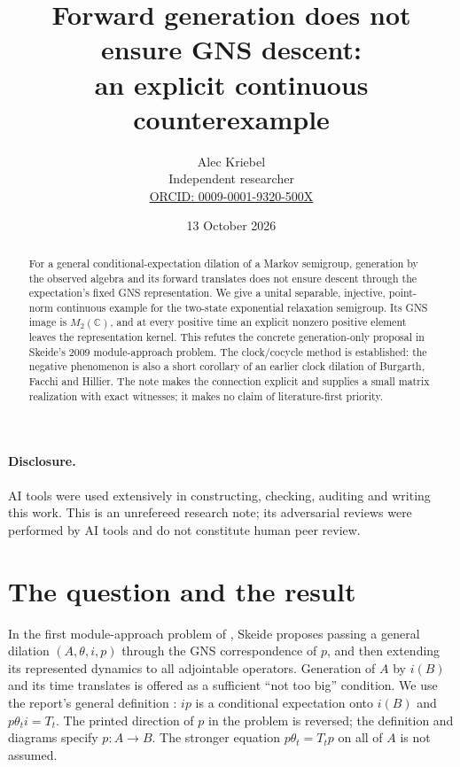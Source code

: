 \documentclass[11pt]{article}
\title{Forward generation does not ensure GNS descent:\\an explicit continuous counterexample}
\author{Alec Kriebel\\Independent researcher\\
\small\href{https://orcid.org/0009-0001-9320-500X}{ORCID: 0009-0001-9320-500X}}
\date{13 October 2026}
\newcommand{\C}{\mathbb C}
\begin{document}
\maketitle
\begin{abstract}
For a general conditional-expectation dilation of a Markov semigroup,
generation by the observed algebra and its forward translates does not
ensure descent through the expectation's fixed GNS representation. We give
a unital separable, injective, point-norm continuous example for the
two-state exponential relaxation semigroup. Its GNS image is $M_2(\C)$,
and at every positive time an explicit nonzero positive element leaves
the representation kernel. This refutes the concrete generation-only
proposal in Skeide's 2009 module-approach problem. The clock/cocycle
method is established: the negative phenomenon is also a short corollary
of an earlier clock dilation of Burgarth, Facchi and Hillier. The note
makes the connection explicit and supplies a small matrix realization
with exact witnesses; it makes no claim of literature-first priority.
\end{abstract}

\paragraph{Disclosure.}
AI tools were used extensively in constructing, checking, auditing and
writing this work. This is an unrefereed research note; its adversarial
reviews were performed by AI tools and do not constitute human peer review.

\section*{The question and the result}
In the first module-approach problem of \cite[pp.~542--543]{owr}, Skeide
proposes passing a general dilation $(A,\theta,i,p)$ through the GNS
correspondence of $p$, and then extending its represented dynamics to all
adjointable operators. Generation of $A$ by $i(B)$ and its time translates
is offered as a sufficient ``not too big'' condition. We use the report's
general definition \cite[pp.~497--498]{owr}: $ip$ is a conditional
expectation onto $i(B)$ and $p\theta_t i=T_t$. The printed direction of
$p$ in the problem is reversed; the definition and diagrams specify
$p:A\to B$. The stronger equation $p\theta_t=T_t p$ on all of $A$ is
not assumed.
\end{document}
